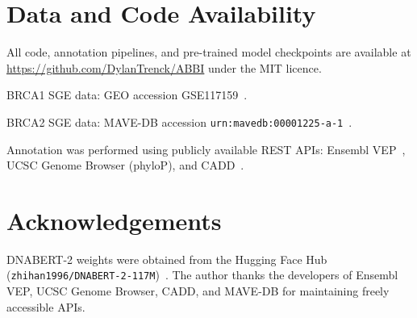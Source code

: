 \documentclass[12pt]{article}
\begin{document}
\section*{Data and Code Availability}

All code, annotation pipelines, and pre-trained model checkpoints are available at
\url{https://github.com/DylanTrenck/ABBI} under the MIT licence.

BRCA1 SGE data: GEO accession GSE117159~\citep{findlay2018}.

BRCA2 SGE data: MAVE-DB accession \texttt{urn:mavedb:00001225-a-1}~\citep{huang2025,mavedb}.

Annotation was performed using publicly available REST APIs: Ensembl VEP~\citep{vep},
UCSC Genome Browser (phyloP), and CADD~\citep{cadd}.

\section*{Acknowledgements}

DNABERT-2 weights were obtained from the Hugging Face Hub
(\texttt{zhihan1996/DNABERT-2-117M})~\citep{dnabert2}.
The author thanks the developers of Ensembl VEP, UCSC Genome Browser, CADD, and
MAVE-DB for maintaining freely accessible APIs.



\end{document}
